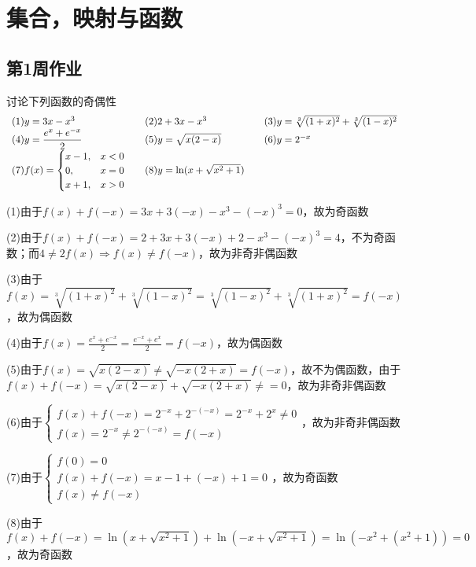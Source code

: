 \chapter{集合，映射与函数}
\section{第1周作业}
\begin{example}{讨论下列函数的奇偶性}{}\vspace{-10pt}
\[\begin{array}{l@{\quad\quad}l@{\quad\quad}l}
    (1)y=3x-x^3&(2)2+3x-x^3&(3)y=\sqrt[3]{(1+x)^2}+\sqrt[3]{(1-x)^2}\\
    (4)y=\dfrac{e^x+e^{-x}}{2}&(5)y=\sqrt{x(2-x)}&(6)y=2^{-x}\\
    (7)f(x)=\begin{cases}x-1,&x<0\\0,&x=0\\x+1,&x>0\end{cases}&(8)y=\ln (x+\sqrt{x^2+1})
\end{array}\]\end{example}
\begin{solution}
    (1)由于$f(x)+f(-x)=3x+3(-x)-x^3-(-x)^3=0$，故为奇函数

    (2)由于$f(x)+f(-x)=2+3x+3(-x)+2-x^3-(-x)^3=4$，不为奇函数；而$4\ne 2f(x)\Rightarrow f(x)\ne f(-x)$，故为非奇非偶函数

    (3)由于$f(x)=\sqrt[3]{(1+x)^2}+\sqrt[3]{(1-x)^2}=\sqrt[3]{(1-x)^2}+\sqrt[3]{(1+x)^2}=f(-x)$，故为偶函数

    (4)由于$f(x)=\frac{e^x+e^{-x}}{2}=\frac{e^{-x}+e^x}{2}=f(-x)$，故为偶函数

    (5)由于$f(x)=\sqrt{x(2-x)}\neq\sqrt{-x(2+x)}=f(-x)$，故不为偶函数，由于$f(x)+f(-x)=\sqrt{x(2-x)}+\sqrt{-x(2+x)}\neq=0$，故为非奇非偶函数

    (6)由于$\begin{cases}f(x)+f(-x)=2^{-x}+2^{-(-x)}=2^{-x}+2^{x}\ne 0\\f(x)=2^{-x}\neq2^{-(-x)}=f(-x)\end{cases}$，故为非奇非偶函数

    (7)由于$\begin{cases}f(0)=0\\f(x)+f(-x)=x-1+(-x)+1=0\\f(x)\neq f(-x)\end{cases}$，故为奇函数

    (8)由于$f(x)+f(-x)=\ln (x+\sqrt{x^2+1})+\ln (-x+\sqrt{x^2+1})=\ln (-x^2+(x^2+1))=0$，故为奇函数
\end{solution}
